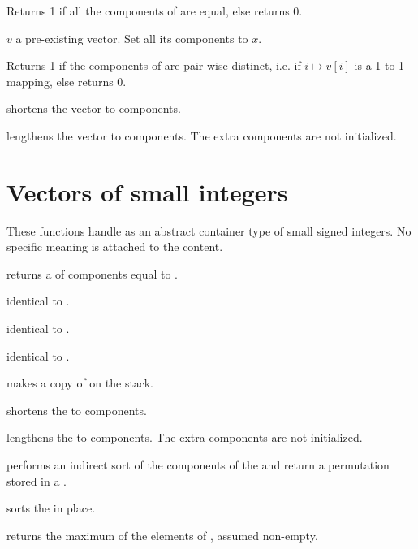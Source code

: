  Returns 1 if all the components of  are
equal, else returns 0.

 $v$ a pre-existing vector. Set all its
components to $x$.

  Returns 1 if the components of  are
pair-wise distinct, i.e. if $i\mapsto v[i]$ is a 1-to-1 mapping, else returns
0.

 shortens the vector  to 
components.

 lengthens the vector 
to  components. The extra components are not initialized.

\section{Vectors of small integers}


These functions handle  as an abstract container type
of small signed integers. No specific meaning is attached to the content.

 returns a 
of  components equal to .

 identical to .

 identical to .

 identical to .

 makes a copy of  on the stack.

 shortens the  
to  components.

 lengthens the 
 to  components. The extra components are not initialized.

 performs an indirect sort of the
components of the   and return a permutation stored in a
.

 sorts the   in place.

 returns the maximum of the elements of
 , assumed non-empty.

